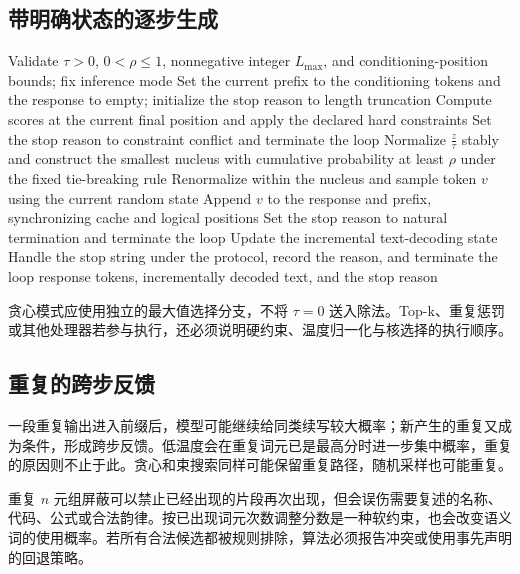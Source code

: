 \documentclass[../textbook.tex]{subfiles}
\begin{document}
\subsection{带明确状态的逐步生成}
\begin{algorithm}[温度与核采样的有限生成过程]
\label{alg:ar-sampling}
\begin{myalgorithmic}[1]
\State Validate $\tau>0$, $0<\rho\le1$, nonnegative integer $L_{\max}$, and conditioning-position bounds; fix inference mode
\State Set the current prefix to the conditioning tokens and the response to empty; initialize the stop reason to length truncation
  \State Compute scores at the current final position and apply the declared hard constraints
    \State Set the stop reason to constraint conflict and terminate the loop
  \EndIf
  \State Normalize $\frac{z}{\tau}$ stably and construct the smallest nucleus with cumulative probability at least $\rho$ under the fixed tie-breaking rule
  \State Renormalize within the nucleus and sample token $v$ using the current random state
  \State Append $v$ to the response and prefix, synchronizing cache and logical positions
    \State Set the stop reason to natural termination and terminate the loop
  \EndIf
  \State Update the incremental text-decoding state
    \State Handle the stop string under the protocol, record the reason, and terminate the loop
  \EndIf
\EndFor
\State \Return response tokens, incrementally decoded text, and the stop reason
\end{myalgorithmic}
贪心模式应使用独立的最大值选择分支，不将 $\tau=0$ 送入除法。Top-k、重复惩罚或其他处理器若参与执行，还必须说明硬约束、温度归一化与核选择的执行顺序。
\end{algorithm}

\subsection{重复的跨步反馈}
一段重复输出进入前缀后，模型可能继续给同类续写较大概率；新产生的重复又成为条件，形成跨步反馈。低温度会在重复词元已是最高分时进一步集中概率，重复的原因则不止于此。贪心和束搜索同样可能保留重复路径，随机采样也可能重复。

重复 $n$ 元组屏蔽可以禁止已经出现的片段再次出现，但会误伤需要复述的名称、代码、公式或合法韵律。按已出现词元次数调整分数是一种软约束，也会改变语义词的使用概率。若所有合法候选都被规则排除，算法必须报告冲突或使用事先声明的回退策略。
\end{document}
